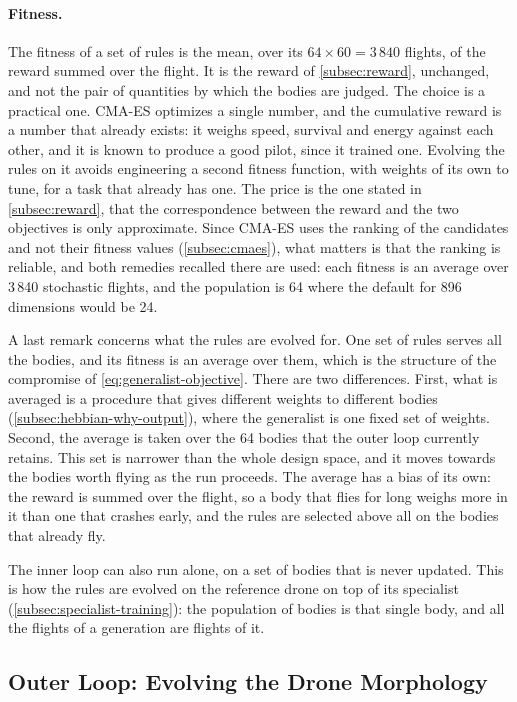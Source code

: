 \paragraph{Fitness.} The fitness of a set of rules is the mean, over its $64 \times 60 = 3\,840$ flights, of the reward summed over the flight. It is the reward of \autoref{subsec:reward}, unchanged, and not the pair of quantities by which the bodies are judged. The choice is a practical one. CMA-ES optimizes a single number, and the cumulative reward is a number that already exists: it weighs speed, survival and energy against each other, and it is known to produce a good pilot, since it trained one. Evolving the rules on it avoids engineering a second fitness function, with weights of its own to tune, for a task that already has one. The price is the one stated in \autoref{subsec:reward}, that the correspondence between the reward and the two objectives is only approximate. Since CMA-ES uses the ranking of the candidates and not their fitness values (\autoref{subsec:cmaes}), what matters is that the ranking is reliable, and both remedies recalled there are used: each fitness is an average over 3\,840 stochastic flights, and the population is 64 where the default for 896 dimensions would be 24.

A last remark concerns what the rules are evolved for. One set of rules serves all the bodies, and its fitness is an average over them, which is the structure of the compromise of \eqref{eq:generalist-objective}. There are two differences. First, what is averaged is a procedure that gives different weights to different bodies (\autoref{subsec:hebbian-why-output}), where the generalist is one fixed set of weights. Second, the average is taken over the 64 bodies that the outer loop currently retains. This set is narrower than the whole design space, and it moves towards the bodies worth flying as the run proceeds. The average has a bias of its own: the reward is summed over the flight, so a body that flies for long weighs more in it than one that crashes early, and the rules are selected above all on the bodies that already fly.

The inner loop can also run alone, on a set of bodies that is never updated. This is how the rules are evolved on the reference drone on top of its specialist (\autoref{subsec:specialist-training}): the population of bodies is that single body, and all the flights of a generation are flights of it.

\subsection{Outer Loop: Evolving the Drone Morphology}
\label{subsec:outer-loop}

